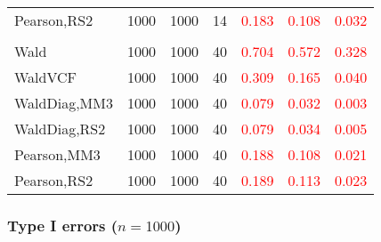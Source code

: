 \documentclass[
]{article}
\begin{document}
\begin{table}[H]
{\begin{tabular}[t]{lrrrrrr}
\hspace{1em}Pearson,RS2 & 1000 & 1000 & 14 & \textcolor{red}{0.183} & \textcolor{red}{0.108} & \textcolor{red}{0.032}\\
\addlinespace[0.3em]
\multicolumn{7}{l}{\textbf{3F 15V}}\\
\hspace{1em}Wald & 1000 & 1000 & 40 & \textcolor{red}{0.704} & \textcolor{red}{0.572} & \textcolor{red}{0.328}\\
\hspace{1em}WaldVCF & 1000 & 1000 & 40 & \textcolor{red}{0.309} & \textcolor{red}{0.165} & \textcolor{red}{0.040}\\
\hspace{1em}WaldDiag,MM3 & 1000 & 1000 & 40 & \textcolor{red}{0.079} & \textcolor{red}{0.032} & \textcolor{red}{0.003}\\
\hspace{1em}WaldDiag,RS2 & 1000 & 1000 & 40 & \textcolor{red}{0.079} & \textcolor{red}{0.034} & \textcolor{red}{0.005}\\
\hspace{1em}Pearson,MM3 & 1000 & 1000 & 40 & \textcolor{red}{0.188} & \textcolor{red}{0.108} & \textcolor{red}{0.021}\\
\hspace{1em}Pearson,RS2 & 1000 & 1000 & 40 & \textcolor{red}{0.189} & \textcolor{red}{0.113} & \textcolor{red}{0.023}\\
\bottomrule
\end{tabular}}
\endgroup{}
\end{table}

\hypertarget{type-i-errors-n1000-1}{%
\subsubsection{\texorpdfstring{Type I errors
(\(n=1000\))}{Type I errors (n=1000)}}\label{type-i-errors-n1000-1}}
\end{document}
